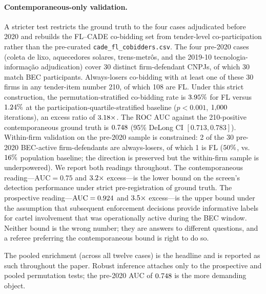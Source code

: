 \paragraph{Contemporaneous-only validation.}
A stricter test restricts the ground truth to the four cases
adjudicated before 2020 and rebuilds the FL--CADE co-bidding
set from tender-level co-participation rather than the
pre-curated \texttt{cade\_fl\_cobidders.csv}. The four pre-2020
cases (coleta de lixo, aquecedores solares, trens-metr\^os, and
the 2019-10 tecnologia-informa\c{c}\~ao adjudication) cover 30
distinct firm-defendant CNPJs, of which 30 match BEC
participants. Always-losers co-bidding with at least one of
these 30 firms in any tender-item number 210, of which 108 are
FL. Under this strict construction, the permutation-stratified
co-bidding rate is $3.95\%$ for FL versus $1.24\%$ at the
participation-quartile-stratified baseline ($p < 0.001$,
$1{,}000$ iterations), an excess ratio of $3.18\times$. The
ROC AUC against the 210-positive contemporaneous ground truth
is $0.748$ (95\% DeLong CI $[0.713, 0.783]$). Within-firm
validation on the pre-2020 sample is constrained: 2 of the 30
pre-2020 BEC-active firm-defendants are always-losers, of
which 1 is FL ($50\%$, vs.\ $16\%$ population baseline; the
direction is preserved but the within-firm sample is
underpowered). We report both readings throughout. The
contemporaneous reading---$\mathrm{AUC} = 0.75$ and
$3.2\times$ excess---is the lower bound on the screen's
detection performance under strict pre-registration of ground
truth. The prospective reading---$\mathrm{AUC} = 0.924$ and
$3.5\times$ excess---is the upper bound under the assumption
that subsequent enforcement decisions provide informative
labels for cartel involvement that was operationally active
during the BEC window. Neither bound is the wrong number;
they are answers to different questions, and a referee
preferring the contemporaneous bound is right to do so.

The pooled enrichment (across all twelve cases) is the
headline and is reported as such throughout the paper. Robust
inference attaches only to the prospective and pooled
permutation tests; the pre-2020 AUC of $0.748$ is the more
demanding object.

